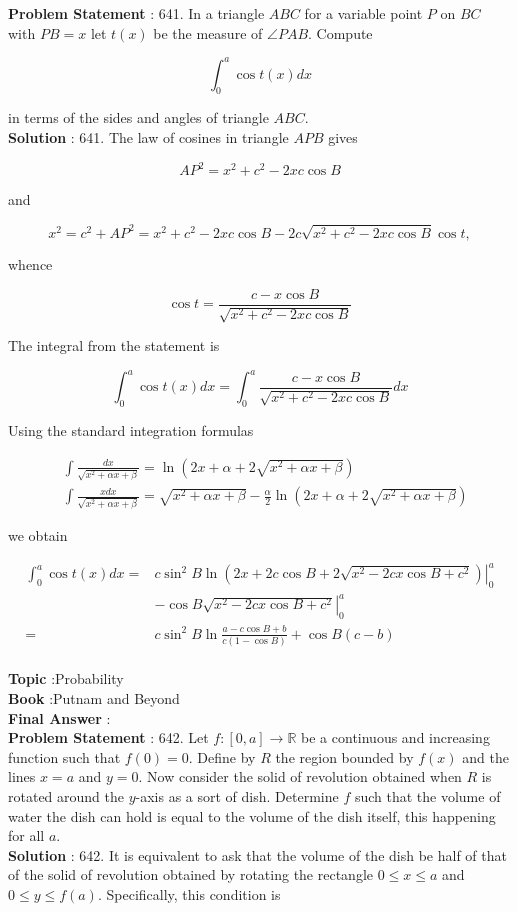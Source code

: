 \documentclass[10pt]{article}
\begin{document}
\textbf{Problem Statement} :
641. In a triangle $A B C$ for a variable point $P$ on $B C$ with $P B=x$ let $t(x)$ be the measure of $\angle P A B$. Compute

$$
\int_{0}^{a} \cos t(x) d x
$$

in terms of the sides and angles of triangle $A B C$.
\\
\textbf{Solution} :
641. The law of cosines in triangle $A P B$ gives

$$
A P^{2}=x^{2}+c^{2}-2 x c \cos B
$$

and

$$
x^{2}=c^{2}+A P^{2}=x^{2}+c^{2}-2 x c \cos B-2 c \sqrt{x^{2}+c^{2}-2 x c \cos B} \cos t,
$$

whence 

$$
\cos t=\frac{c-x \cos B}{\sqrt{x^{2}+c^{2}-2 x c \cos B}}
$$

The integral from the statement is

$$
\int_{0}^{a} \cos t(x) d x=\int_{0}^{a} \frac{c-x \cos B}{\sqrt{x^{2}+c^{2}-2 x c \cos B}} d x
$$

Using the standard integration formulas

$$
\begin{aligned}
&\int \frac{d x}{\sqrt{x^{2}+\alpha x+\beta}}=\ln \left(2 x+\alpha+2 \sqrt{x^{2}+\alpha x+\beta}\right) \\
&\int \frac{x d x}{\sqrt{x^{2}+\alpha x+\beta}}=\sqrt{x^{2}+\alpha x+\beta}-\frac{\alpha}{2} \ln \left(2 x+\alpha+2 \sqrt{x^{2}+\alpha x+\beta}\right)
\end{aligned}
$$

we obtain

$$
\begin{aligned}
\int_{0}^{a} \cos t(x) d x=&\left.c \sin ^{2} B \ln \left(2 x+2 c \cos B+2 \sqrt{x^{2}-2 c x \cos B+c^{2}}\right)\right|_{0} ^{a} \\
&-\left.\cos B \sqrt{x^{2}-2 c x \cos B+c^{2}}\right|_{0} ^{a} \\
=& c \sin ^{2} B \ln \frac{a-c \cos B+b}{c(1-\cos B)}+\cos B(c-b)
\end{aligned}
$$
\\
\textbf{Topic} :Probability\\
\textbf{Book} :Putnam and Beyond\\
\textbf{Final Answer} :\\


\textbf{Problem Statement} :
642. Let $f:[0, a] \rightarrow \mathbb{R}$ be a continuous and increasing function such that $f(0)=0$. Define by $R$ the region bounded by $f(x)$ and the lines $x=a$ and $y=0$. Now consider the solid of revolution obtained when $R$ is rotated around the $y$-axis as a sort of dish. Determine $f$ such that the volume of water the dish can hold is equal to the volume of the dish itself, this happening for all $a$.
\\
\textbf{Solution} :
642. It is equivalent to ask that the volume of the dish be half of that of the solid of revolution obtained by rotating the rectangle $0 \leq x \leq a$ and $0 \leq y \leq f(a)$. Specifically, this condition is
\end{document}
